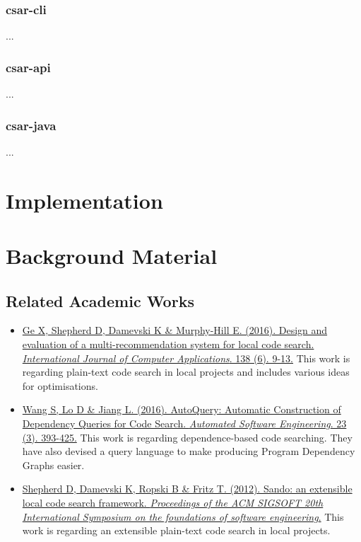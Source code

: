 \documentclass[12pt, letterpaper]{article}
\begin{document}
\subsubsection{csar-cli}
...

\subsubsection{csar-api}
...

\subsubsection{csar-java}
...

\section{Implementation}

\section{Background Material}
\subsection{Related Academic Works}
\begin{itemize}
  \item \href{http://www.sciencedirect.com.ezproxy.library.qmul.ac.uk/science/article/pii/S1045926X16300970?_rdoc=1&_fmt=high&_origin=gateway&_docanchor=&md5=b8429449ccfc9c30159a5f9aeaa92ffb&ccp=y}{Ge X, Shepherd D, Damevski K \& Murphy-Hill E. (2016). Design and evaluation of a multi-recommendation system for local code search. \textit{International Journal of Computer Applications}. 138 (6). 9-13.}\newline
  This work is regarding plain-text code search in local projects and includes various ideas for optimisations.
  \item \href{https://link-springer-com.ezproxy.library.qmul.ac.uk/article/10.1007%2Fs10515-014-0170-2}{Wang S, Lo D \& Jiang L. (2016). AutoQuery: Automatic Construction of Dependency Queries for Code Search. \textit{Automated Software Engineering}. 23 (3). 393-425.}\newline
  This work is regarding dependence-based code searching.
  They have also devised a query language to make producing Program Dependency Graphs easier.
  \item \href{http://dl.acm.org.ezproxy.library.qmul.ac.uk/citation.cfm?id=2393612}{Shepherd D, Damevski K, Ropski B \& Fritz T. (2012). Sando: an extensible local code search framework. \textit{Proceedings of the ACM SIGSOFT 20th International Symposium on the foundations of software engineering}.}\newline
  This work is regarding an extensible plain-text code search in local projects.
\end{itemize}
\end{document}
